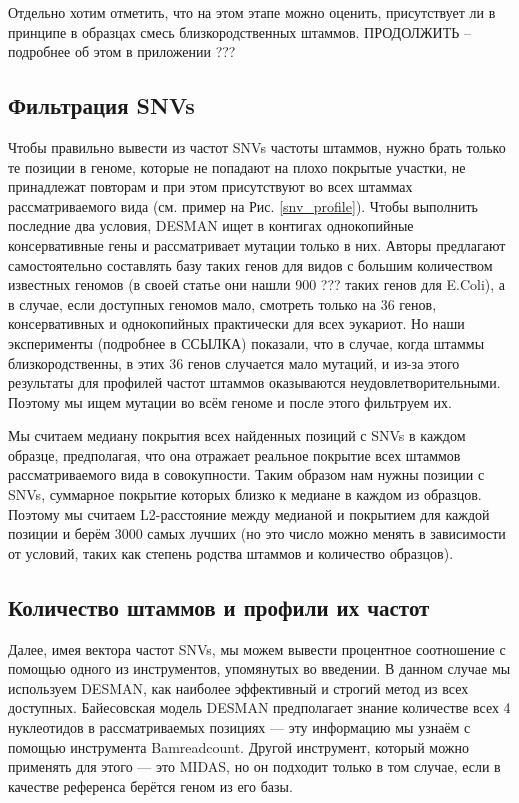 \documentclass{spbau-diploma}
\begin{document}
Отдельно хотим отметить, что на этом этапе можно оценить, присутствует ли в принципе в образцах смесь близкородственных штаммов. ПРОДОЛЖИТЬ -- подробнее об этом в приложении ???

\subsection{Фильтрация SNVs}

Чтобы правильно вывести из частот SNVs частоты штаммов, нужно брать только те позиции в геноме, которые не попадают на плохо покрытые участки, не принадлежат повторам и при этом присутствуют во всех штаммах рассматриваемого вида (см. пример на Рис. \ref{snv_profile}). Чтобы выполнить последние два условия, DESMAN ищет в контигах однокопийные консервативные гены и рассматривает мутации только в них. Авторы предлагают самостоятельно составлять базу таких генов для видов с большим количеством известных геномов (в своей статье они нашли 900 ??? таких генов для E.Coli), а в случае, если доступных геномов мало, смотреть только на 36 генов, консервативных и однокопийных практически для всех эукариот. Но наши эксперименты (подробнее в ССЫЛКА) показали, что в случае, когда штаммы близкородственны, в этих 36 генов случается мало мутаций, и из-за этого результаты для профилей частот штаммов оказываются неудовлетворительными. Поэтому мы ищем мутации во всём геноме и после этого фильтруем их. 

Мы считаем медиану покрытия всех найденных позиций с SNVs в каждом образце, предполагая, что она отражает реальное покрытие всех штаммов рассматриваемого вида в совокупности. Таким образом нам нужны позиции с SNVs, суммарное покрытие которых близко к медиане в каждом из образцов. Поэтому мы считаем L2-расстояние между медианой и покрытием для каждой позиции и берём 3000 самых лучших (но это число можно менять в зависимости от условий, таких как степень родства штаммов и количество образцов).

\subsection{Количество штаммов и профили их частот}

Далее, имея вектора частот SNVs, мы можем вывести процентное соотношение с помощью одного из инструментов, упомянутых во введении. В данном случае мы используем DESMAN, как наиболее эффективный и строгий метод из всех доступных. Байесовская модель DESMAN предполагает знание количестве всех 4 нуклеотидов в рассматриваемых позициях --- эту информацию мы узнаём с помощью инструмента Bamreadcount. Другой инструмент, который можно применять для этого --- это MIDAS, но он подходит только в том случае, если в качестве референса берётся геном из его базы.
\end{document}
